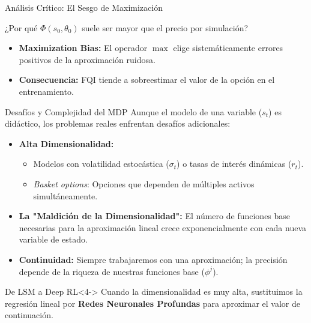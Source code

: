 \documentclass[xcolor=dvipsnames, handout]{beamer}
\begin{document}
\begin{frame}{Análisis Crítico: El Sesgo de Maximización}

¿Por qué $\Phi(s_0, \theta_0)$ suele ser mayor que el precio por simulación?

\begin{itemize}
    \item \textbf{Maximization Bias:} El operador $\max$ elige sistemáticamente errores positivos de la aproximación ruidosa.
    \item \textbf{Consecuencia:} FQI tiende a sobreestimar el valor de la opción en el entrenamiento.
\end{itemize}

\begin{center}
\end{center}
\end{frame}%
\begin{frame}{Desaf\'ios y Complejidad del MDP}
Aunque el modelo de una variable ($s_t$) es didáctico, los problemas reales enfrentan desafíos adicionales:

\begin{itemize}
    \item \textbf{Alta Dimensionalidad:}
    \begin{itemize}
        \item Modelos con volatilidad estocástica ($\sigma_t$) o tasas de interés dinámicas ($r_t$).
        \item \textit{Basket options}: Opciones que dependen de múltiples activos simultáneamente.
    \end{itemize}
    \item<2-> \textbf{La "Maldici\'on de la Dimensionalidad":} El número de funciones base necesarias para la aproximación lineal crece exponencialmente con cada nueva variable de estado.
    \item<3-> \textbf{Continuidad:} Siempre trabajaremos con una aproximación; la precisión depende de la riqueza de nuestras funciones base ($\phi^j$).
\end{itemize}

\begin{block}{De LSM a Deep RL}<4->
    Cuando la dimensionalidad es muy alta, sustituimos la regresión lineal por \textbf{Redes Neuronales Profundas} para aproximar el valor de continuación.
\end{block}
\end{frame}
\end{document}
